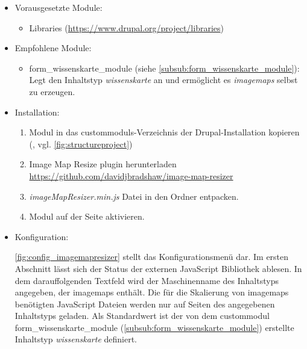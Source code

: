 \begin{itemize}[parsep=0pt, itemsep=5.0pt plus 2.0pt minus 1.0pt, leftmargin=*]
	\item Vorausgesetzte Module:

	\begin{itemize}
		\item Libraries (\url{https://www.drupal.org/project/libraries})
	\end{itemize}


	\item Empfohlene Module:

	\begin{itemize}
		\item form\_wissenskarte\_module (siehe \cref{subsub:form_wissenskarte_module}): Legt den Inhaltstyp \textit{wissenskarte} an und ermöglicht es \textit{\glspl{imagemap}} selbst zu erzeugen.
	\end{itemize}

	\item Installation:
	\begin{enumerate}
		\item Modul in das \glspl{custommodul}-Verzeichnis der Drupal-Installation kopieren  (\zB {}, vgl. \cref{fig:structureproject})
		\item Image Map Resize plugin herunterladen \url{https://github.com/davidjbradshaw/image-map-resizer}
		\item \textit{imageMapResizer.min.js} Datei in den Ordner  entpacken.
		\item Modul auf der Seite  aktivieren.
	\end{enumerate}


	\item Konfiguration:

	\cref{fig:config_imagemapresizer} stellt das Konfigurationsmenü dar. Im ersten Abschnitt lässt sich der Status der externen JavaScript Bibliothek ablesen. In dem darauffolgenden Textfeld wird der Maschinenname des Inhaltstyps angegeben, der \glspl{imagemap} enthält. Die für die Skalierung von \glspl{imagemap} benötigten JavaScript Dateien werden nur auf Seiten des angegebenen Inhaltstyps geladen. Als Standardwert ist der von dem \gls{custommodul} form\_wissenskarte\_module (\cref{subsub:form_wissenskarte_module}) erstellte Inhaltstyp \textit{wissenskarte} definiert.

\end{itemize}




